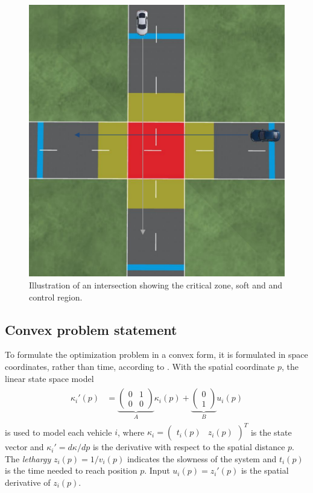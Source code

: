 \documentclass[letterpaper,10pt,conference]{ieeeconf}
\begin{document}
\begin{figure}[h!]
    \centering
    \includegraphics[width=0.9\columnwidth]{czone.pdf}
    \caption{Illustration of an intersection showing the critical zone, soft and and control region.}
    \label{fig:Int}
\end{figure}

\subsection{Convex problem statement}
To formulate the optimization problem in a convex form, it is formulated in space coordinates, rather than time, according to \cite{nikolce}. With the spatial coordinate $p$, the linear state space model
\begin{align}\label{statesp}
\begin{split}
\kappa_i'(p)&=\underbrace{\begin{pmatrix}
0& 1\\
0& 0
\end{pmatrix}}_{{A}}\kappa_i(p) + \underbrace{\begin{pmatrix}
0\\
1\end{pmatrix}}_Bu_i(p)
\end{split}
\end{align}
is used to model each vehicle $i$, where $\kappa_i=\begin{pmatrix}t_i(p)& z_i(p)\end{pmatrix}^T$ is the state vector and $\kappa_i'=d\kappa/dp$ is the derivative with respect to the spatial distance $p$. The \emph{lethargy} \mbox{$z_i(p)=1/v_i(p)$} indicates the slowness of the system and $t_i(p)$ is the time needed to reach position $p$. Input $u_i(p)=z_i'(p)$ is the spatial derivative of $z_i(p)$.
\end{document}
